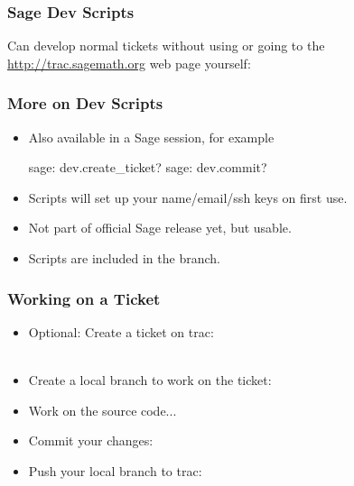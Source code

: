 
\begin{frame}[fragile]
  \frametitle{Sage Dev Scripts}

  Can develop normal tickets without using  or going to the
  \url{http://trac.sagemath.org} web page yourself:

\end{frame}


\begin{frame}[fragile]
  \frametitle{More on Dev Scripts}
  
  \begin{itemize}
  \item 
    Also available in a Sage session, for example
    \begin{shell}
      sage: dev.create_ticket?
      sage: dev.commit?
    \end{shell}
  \item Scripts will set up your name/email/ssh keys on first use.
  \item Not part of official Sage release yet, but usable.
  \item Scripts are included in the 
    branch.
  \end{itemize}
  
\end{frame}



\begin{frame}
  \frametitle{Working on a Ticket}
  
  \begin{itemize}
  \item Optional: Create a ticket on trac:\\
    \\
  \item Create a local branch to work on the ticket:\\
  \item Work on the source code...
  \item Commit your changes:\\
  \item Push your local branch to trac:\\
  \end{itemize}
\end{frame}



